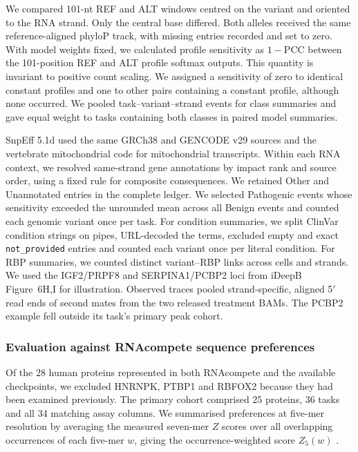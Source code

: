 \documentclass[webpdf,contemporary,large]{current_assets/oup-authoring-template}
\begin{document}
We compared 101-nt REF and ALT windows centred on the variant and oriented to the RNA strand. Only the central base differed. Both alleles received the same reference-aligned phyloP track, with missing entries recorded and set to zero. With model weights fixed, we calculated profile sensitivity as $1-\mathrm{PCC}$ between the 101-position REF and ALT profile softmax outputs. This quantity is invariant to positive count scaling. We assigned a sensitivity of zero to identical constant profiles and one to other pairs containing a constant profile, although none occurred. We pooled task--variant--strand events for class summaries and gave equal weight to tasks containing both classes in paired model summaries.

SnpEff 5.1d used the same GRCh38 and GENCODE v29 sources and the vertebrate mitochondrial code for mitochondrial transcripts. Within each RNA context, we resolved same-strand gene annotations by impact rank and source order, using a fixed rule for composite consequences. We retained Other and Unannotated entries in the complete ledger. We selected Pathogenic events whose sensitivity exceeded the unrounded mean across all Benign events and counted each genomic variant once per task. For condition summaries, we split ClinVar condition strings on pipes, URL-decoded the terms, excluded empty and exact \texttt{not\_provided} entries and counted each variant once per literal condition. For RBP summaries, we counted distinct variant--RBP links across cells and strands. We used the IGF2/PRPF8 and SERPINA1/PCBP2 loci from iDeepB Figure~6H,I for illustration. Observed traces pooled strand-specific, aligned 5$\prime$ read ends of second mates from the two released treatment BAMs. The PCBP2 example fell outside its task's primary peak cohort.

\subsubsection{Evaluation against RNAcompete sequence preferences}\label{subsec:order_methods}

Of the 28 human proteins represented in both RNAcompete and the available checkpoints, we excluded HNRNPK, PTBP1 and RBFOX2 because they had been examined previously. The primary cohort comprised 25 proteins, 36 tasks and all 34 matching assay columns. We summarised preferences at five-mer resolution by averaging the measured seven-mer $Z$ scores over all overlapping occurrences of each five-mer $w$, giving the occurrence-weighted score $Z_5(w)$ \citep{ray2013compendium}.
\end{document}

